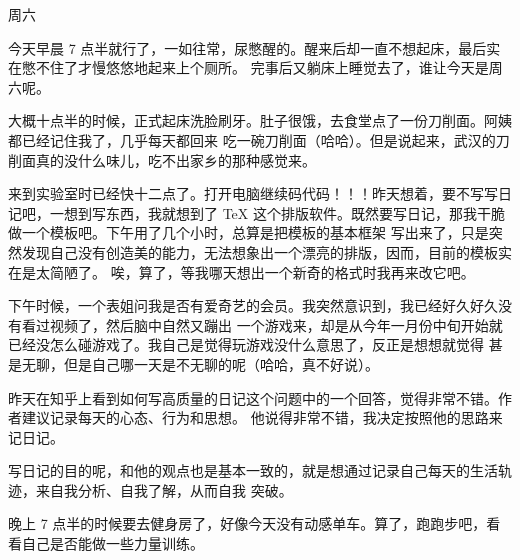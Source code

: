 

周六

今天早晨 7 点半就行了，一如往常，尿憋醒的。醒来后却一直不想起床，最后实在憋不住了才慢悠悠地起来上个厕所。
完事后又躺床上睡觉去了，谁让今天是周六呢。

大概十点半的时候，正式起床洗脸刷牙。肚子很饿，去食堂点了一份刀削面。阿姨都已经记住我了，几乎每天都回来
吃一碗刀削面（哈哈）。但是说起来，武汉的刀削面真的没什么味儿，吃不出家乡的那种感觉来。

来到实验室时已经快十二点了。打开电脑继续码代码！！！昨天想着，要不写写日记吧，一想到写东西，我就想到了
\TeX{} 这个排版软件。既然要写日记，那我干脆做一个模板吧。下午用了几个小时，总算是把模板的基本框架
写出来了，只是突然发现自己没有创造美的能力，无法想象出一个漂亮的排版，因而，目前的模板实在是太简陋了。
唉，算了，等我哪天想出一个新奇的格式时我再来改它吧。

下午时候，一个表姐问我是否有爱奇艺的会员。我突然意识到，我已经好久好久没有看过视频了，然后脑中自然又蹦出
一个游戏来，却是从今年一月份中旬开始就已经没怎么碰游戏了。我自己是觉得玩游戏没什么意思了，反正是想想就觉得
甚是无聊，但是自己哪一天是不无聊的呢（哈哈，真不好说）。

昨天在知乎上看到如何写高质量的日记这个问题中的一个回答，觉得非常不错。作者建议记录每天的心态、行为和思想。
他说得非常不错，我决定按照他的思路来记日记。

写日记的目的呢，和他的观点也是基本一致的，就是想通过记录自己每天的生活轨迹，来自我分析、自我了解，从而自我
突破。

晚上 7 点半的时候要去健身房了，好像今天没有动感单车。算了，跑跑步吧，看看自己是否能做一些力量训练。

